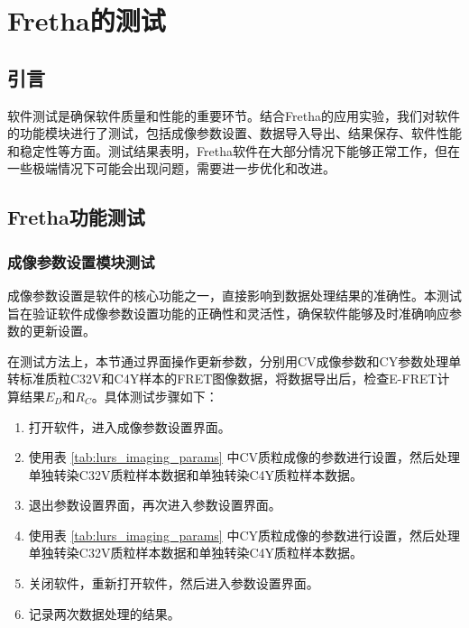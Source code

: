 \chapter{Fretha的测试}

\section{引言}
\ifshowtext

软件测试是确保软件质量和性能的重要环节。结合Fretha的应用实验，我们对软件的功能模块进行了测试，包括成像参数设置、数据导入导出、结果保存、软件性能和稳定性等方面。测试结果表明，Fretha软件在大部分情况下能够正常工作，但在一些极端情况下可能会出现问题，需要进一步优化和改进。

\fi

\section{Fretha功能测试}

\subsection{成像参数设置模块测试}
成像参数设置是软件的核心功能之一，直接影响到数据处理结果的准确性。本测试旨在验证软件成像参数设置功能的正确性和灵活性，确保软件能够及时准确响应参数的更新设置。

在测试方法上，本节通过界面操作更新参数，分别用CV成像参数和CY参数处理单转标准质粒C32V和C4Y样本的FRET图像数据，将数据导出后，检查E-FRET计算结果$E_D$和$R_C$。具体测试步骤如下：
\begin{enumerate}
    \item 打开软件，进入成像参数设置界面。
    \item 使用表 \ref{tab:lurs_imaging_params} 中CV质粒成像的参数进行设置，然后处理单独转染C32V质粒样本数据和单独转染C4Y质粒样本数据。
    \item 退出参数设置界面，再次进入参数设置界面。
    \item 使用表 \ref{tab:lurs_imaging_params} 中CY质粒成像的参数进行设置，然后处理单独转染C32V质粒样本数据和单独转染C4Y质粒样本数据。
    \item 关闭软件，重新打开软件，然后进入参数设置界面。
    \item 记录两次数据处理的结果。
\end{enumerate}

